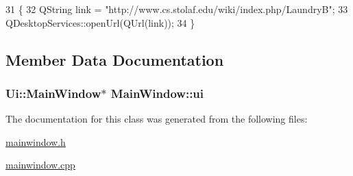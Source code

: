 \begin{DoxyCode}
31 \{
32     QString link = \textcolor{stringliteral}{"http://www.cs.stolaf.edu/wiki/index.php/LaundryB"};
33     QDesktopServices::openUrl(QUrl(link));
34 \}
\end{DoxyCode}


\subsection{Member Data Documentation}
\hypertarget{classMainWindow_a35466a70ed47252a0191168126a352a5}{}
\subsubsection[{ui}]{\setlength{\rightskip}{0pt plus 5cm}Ui\+::\+Main\+Window$\ast$ Main\+Window\+::ui\hspace{0.3cm}{\ttfamily [private]}}\label{classMainWindow_a35466a70ed47252a0191168126a352a5}


The documentation for this class was generated from the following files\+:\begin{DoxyCompactItemize}
\item 
\hyperlink{mainwindow_8h}{mainwindow.\+h}\item 
\hyperlink{mainwindow_8cpp}{mainwindow.\+cpp}\end{DoxyCompactItemize}
